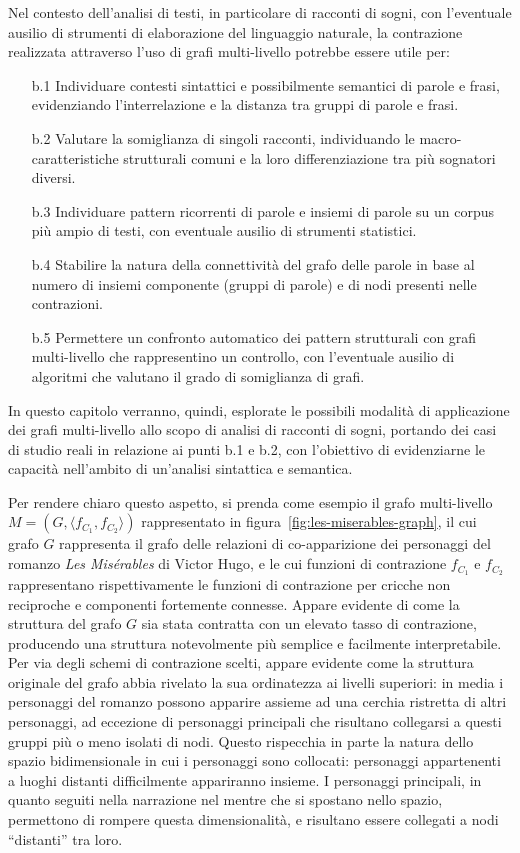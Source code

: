 Nel contesto dell'analisi di testi, in particolare di racconti di sogni, con l'eventuale ausilio di strumenti di
elaborazione del linguaggio naturale, la contrazione realizzata attraverso l'uso di grafi multi-livello potrebbe
essere utile per:
\begin{itemize}
    \item[b.1] Individuare contesti sintattici e possibilmente semantici di parole e frasi, evidenziando l'interrelazione
    e la distanza tra gruppi di parole e frasi.
    \item[b.2] Valutare la somiglianza di singoli racconti, individuando le macro-caratteristiche strutturali comuni e
    la loro differenziazione tra più sognatori diversi.
    \item[b.3] Individuare pattern ricorrenti di parole e insiemi di parole su un corpus pi\`u ampio di testi, con
    eventuale ausilio di strumenti statistici.
    \item[b.4] Stabilire la natura della connettività del grafo delle parole in base al numero di insiemi componente
    (gruppi di parole) e di nodi presenti nelle contrazioni.
    \item[b.5] Permettere un confronto automatico dei pattern strutturali con grafi multi-livello che rappresentino
    un controllo, con l'eventuale ausilio di algoritmi che valutano il grado di somiglianza di grafi.
\end{itemize}

In questo capitolo verranno, quindi, esplorate le possibili modalità di applicazione dei grafi multi-livello allo scopo
di analisi di racconti di sogni, portando dei casi di studio reali in relazione ai punti b.1 e b.2, con l'obiettivo di
evidenziarne le capacità nell'ambito di un'analisi sintattica e semantica.



Per rendere chiaro questo aspetto, si prenda come esempio il grafo multi-livello $M = (G, \langle f_{C_1}, f_{C_2}\rangle)$
rappresentato in figura~\ref{fig:les-miserables-graph}, il cui grafo $G$ rappresenta il grafo delle relazioni di
co-apparizione dei personaggi del romanzo \textit{Les Misérables} di Victor Hugo,
e le cui funzioni di contrazione $f_{C_1}$ e $f_{C_2}$ rappresentano rispettivamente le funzioni di contrazione
per cricche non reciproche e componenti fortemente connesse.
Appare evidente di come la struttura del grafo $G$ sia stata contratta con un elevato tasso di contrazione,
producendo una struttura notevolmente più semplice e facilmente interpretabile. Per via degli schemi di
contrazione scelti, appare evidente come la struttura originale del grafo abbia rivelato la sua ordinatezza ai livelli
superiori: in media i personaggi del romanzo possono apparire assieme ad una cerchia ristretta di altri personaggi,
ad eccezione di personaggi principali che risultano collegarsi a questi gruppi più o meno isolati di nodi.
Questo rispecchia in parte la natura dello spazio bidimensionale in cui i personaggi sono collocati: personaggi
appartenenti a luoghi distanti difficilmente appariranno insieme. I personaggi principali, in quanto seguiti
nella narrazione nel mentre che si spostano nello spazio, permettono di rompere questa dimensionalità, e risultano
essere collegati a nodi ``distanti'' tra loro.

